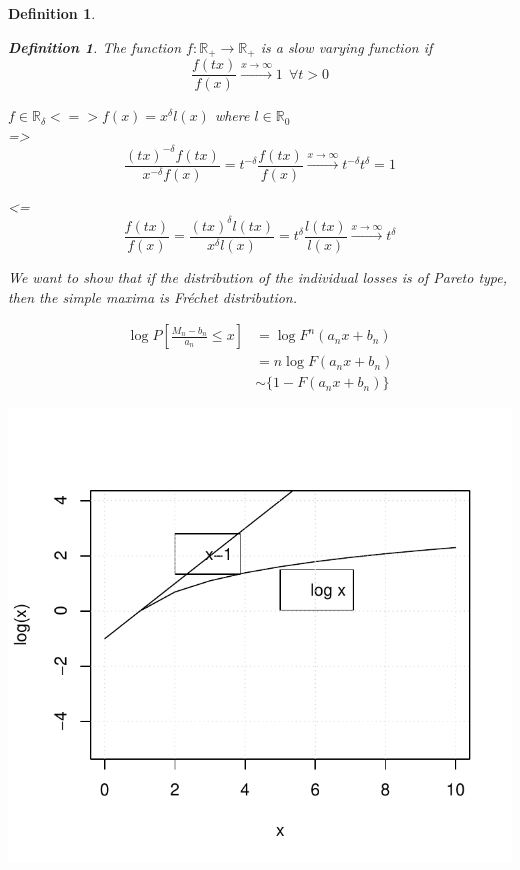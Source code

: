 \documentclass[11pt,a4paper,oneside]{article}\usepackage[]{graphicx}\usepackage[]{color}
\makeatletter
\def\maxwidth{ %
  \ifdim\Gin@nat@width>\linewidth
    \linewidth
  \else
    \Gin@nat@width
  \fi
}
\newenvironment{knitrout}{}{} %
\newtheorem{defi}[subsection]{Definition}
\makeatother
\begin{document}
\begin{algin*}
\begin{defi}
 \begin{defi}
 The function $f:\mathbb{R}_+\rightarrow\mathbb{R}_+$ is a slow varying function if
 $$\frac{f(tx)}{f(x)}\xrightarrow{x\rightarrow\infty}1\ \ \forall t>0$$
 \end{defi}
 
 $f\in\mathbb{R}_{\delta}<=> f(x)=x^{\delta}l(x)$ where $l\in\mathbb{R}_0$\\
 =>
$$\frac{(tx)^{-\delta}f(tx)}{x^{-\delta}f(x)}=t^{-\delta}\frac{f(tx)}{f(x)}\xrightarrow{x\rightarrow\infty}t^{-\delta}t^{\delta}=1$$
  
  <=
 $$\frac{f(tx)}{f(x)}
  =\frac{(tx)^{\delta}l(tx)}{x^{\delta}l(x)}
 =t^{\delta}\frac{l(tx)}{l(x)}\xrightarrow{x\rightarrow\infty}t^{\delta}
$$

We want to show that if the distribution of the individual losses is of Pareto type, then the simple maxima is Fréchet distribution.

\begin{align*}
\log P\left[\frac{M_n-b_n}{a_n}\leq x\right] &= \log F^n(a_nx+b_n)\\
&=n\log F(a_nx+b_n)\\
&\sim\{1-F(a_nx+b_n)\}
\end{align*}

\begin{knitrout}
\color{fgcolor}

{\centering \includegraphics[width=\maxwidth]{figure/plot1-1} 

}
\end{knitrout}
\end{defi}
\end{algin*}
\end{document}
